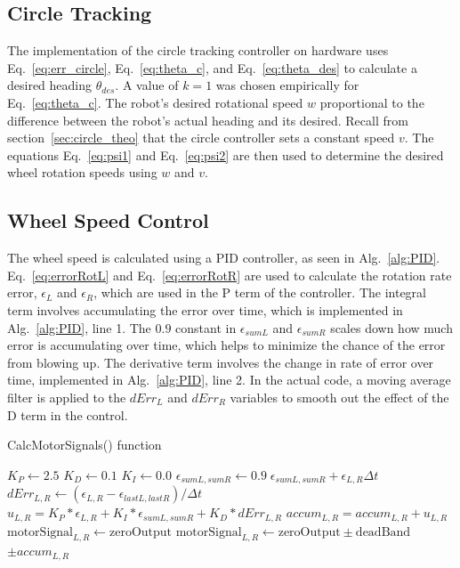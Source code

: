 \documentclass[conference]{../IEEEtran}
\begin{document}
\subsection{Circle Tracking} \label{sec:circle_imp}

The implementation of the circle tracking controller on hardware uses
Eq.~\ref{eq:err_circle}, Eq.~\ref{eq:theta_c}, and Eq.~\ref{eq:theta_des} to calculate a
desired heading $\theta_{des}$. A value of $k = 1$ was chosen empirically for
Eq.~\ref{eq:theta_c}. The robot's desired rotational speed $w$ proportional to the
difference between the robot's actual heading and its desired. Recall from
section~\ref{sec:circle_theo} that the circle controller sets a constant speed $v$.  The
equations Eq.~\ref{eq:psi1} and Eq.~\ref{eq:psi2} are then used to determine the desired
wheel rotation speeds using $w$ and $v$.

\subsection{Wheel Speed Control} \label{sec:pid_imp}
The wheel speed is calculated using a PID controller, as seen in Alg.~\ref{alg:PID}.
Eq.~\ref{eq:errorRotL} and Eq.~\ref{eq:errorRotR} are used to calculate the rotation rate
error, $\epsilon_L$ and $\epsilon_R$, which are used in the P term of the controller. The
integral term involves accumulating the error over time, which is implemented in
Alg.~\ref{alg:PID}, line 1. The $0.9$ constant in $\epsilon_{sumL}$ and $\epsilon_{sumR}$
scales down how much error is accumulating over time, which helps to minimize the chance
of the error from blowing up. The derivative term involves the change in rate of error
over time, implemented in Alg.~\ref{alg:PID}, line 2. In the actual code, a moving average
filter is applied to the $dErr_L$ and $dErr_R$ variables to smooth out the effect of the D
term in the control.

\begin{algorithm}[h]
  \caption{CalcMotorSignals() function}
  \begin{algorithmic}[1]
  \State $K_P \gets 2.5$
  \State $K_D \gets 0.1$
  \State $K_I \gets 0.0$
  \medskip
  \State $\epsilon_{sumL,sumR} \gets 0.9\; \epsilon_{sumL,sumR}+\epsilon_{L,R} \Delta t$
  \State $dErr_{L,R} \gets (\epsilon_{L,R}-\epsilon_{lastL,lastR}) / \Delta t$
  \State $u_{L,R}=K_P*\epsilon_{L,R} + K_I*\epsilon_{sumL,sumR} + K_D*dErr_{L,R}$
  \State $accum_{L,R}=accum_{L,R}+u_{L,R}$
  \medskip
  \State $\text{motorSignal}_{L,R} \gets \text{zeroOutput}$
  \Else
  \State $\text{motorSignal}_{L,R} \gets \text{zeroOutput} \pm \text{deadBand}$ 
  \Statex \hspace{4.8cm} $ \pm accum_{L,R}$
	\EndIf
    \end{algorithmic}
  \label{alg:PID}
\end{algorithm}
\end{document}

